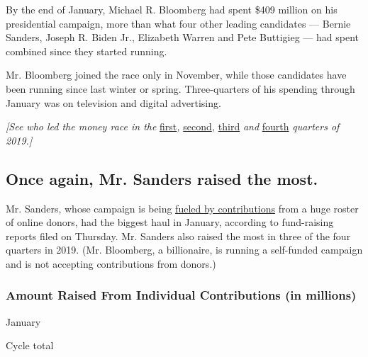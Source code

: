 By the end of January, Michael R. Bloomberg had spent \$409 million on
his presidential campaign, more than what four other leading candidates
--- Bernie Sanders, Joseph R. Biden Jr., Elizabeth Warren and Pete
Buttigieg --- had spent combined since they started running.

Mr. Bloomberg joined the race only in November, while those candidates
have been running since last winter or spring. Three-quarters of his
spending through January was on television and digital advertising.

\emph{{[}See who led the money race in the}
\href{https://www.nytimes3xbfgragh.onion/interactive/2019/us/politics/campaign-finance-2020-fundraising.html}{first}\emph{,}
\href{https://www.nytimes3xbfgragh.onion/interactive/2019/07/16/us/politics/democratic-fundraising-2020.html}{second}\emph{,}
\href{https://www.nytimes3xbfgragh.onion/interactive/2019/10/16/us/elections/democratic-q3-fundraising.html}{third}
\emph{and}
\href{https://www.nytimes3xbfgragh.onion/interactive/2020/02/01/us/elections/democratic-q4-fundraising.html}{fourth}
\emph{quarters of 2019.{]}}

\hypertarget{once-again-mr-sanders-raised-the-most}{%
\subsection{Once again, Mr. Sanders raised the
most.}\label{once-again-mr-sanders-raised-the-most}}

Mr. Sanders, whose campaign is being
\href{https://www.nytimes3xbfgragh.onion/interactive/2020/02/01/us/politics/democratic-presidential-campaign-donors.html?action=click\&module=Top\%20Stories\&pgtype=Homepage}{fueled
by contributions} from a huge roster of online donors, had the biggest
haul in January, according to fund-raising reports filed on Thursday.
Mr. Sanders also raised the most in three of the four quarters in 2019.
(Mr. Bloomberg, a billionaire, is running a self-funded campaign and is
not accepting contributions from donors.)

\hypertarget{amount-raised-from-individual-contributions-in-millions}{%
\subsubsection{Amount Raised From Individual Contributions (in
millions)}\label{amount-raised-from-individual-contributions-in-millions}}

January

Cycle total

